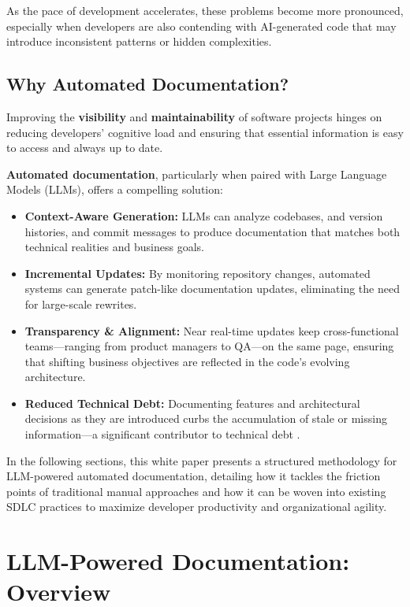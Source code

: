 \documentclass[12pt,oneside]{article}
\begin{document}
As the pace of development accelerates, these problems become more pronounced, especially when developers are also 
contending with AI-generated code that may introduce inconsistent patterns or hidden complexities.

\subsection{Why Automated Documentation?}

Improving the \textbf{visibility} and \textbf{maintainability} of software projects hinges on reducing developers’ 
cognitive load and ensuring that essential information is easy to access and always up to date. 

\textbf{Automated documentation}, particularly when paired with Large Language Models (LLMs), offers a compelling 
solution:

\begin{itemize}
    \item \textbf{Context-Aware Generation:} LLMs can analyze codebases, and version histories, and commit messages to produce documentation that matches both technical realities and business goals.
    \item \textbf{Incremental Updates:} By monitoring repository changes, automated systems can generate patch-like documentation updates, eliminating the need for large-scale rewrites.
    \item \textbf{Transparency \& Alignment:} Near real-time updates keep cross-functional teams—ranging from product managers to QA—on the same page, ensuring that shifting business objectives are reflected in the code’s evolving architecture.
    \item \textbf{Reduced Technical Debt:} Documenting features and architectural decisions as they are introduced curbs the accumulation of stale or missing information—a significant contributor to technical debt \textcite{pandi2023}.
\end{itemize}

In the following sections, this white paper presents a structured methodology for LLM-powered automated documentation, 
detailing how it tackles the friction points of traditional manual approaches and how it can be woven into existing 
SDLC practices to maximize developer productivity and organizational agility.

\section{LLM-Powered Documentation: Overview}
\end{document}
